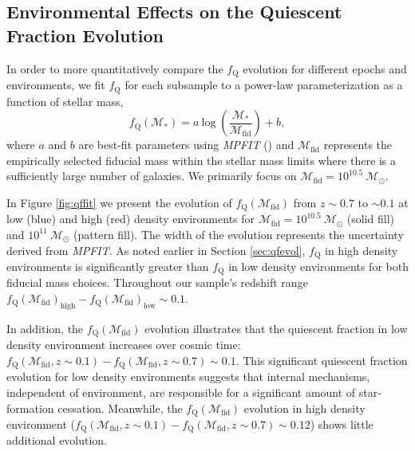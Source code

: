 \documentclass{emulateapj}
\begin{document}
\subsection{Environmental Effects on the Quiescent Fraction Evolution} \label{sec:env_qf_evol}
In order to more quantitatively compare the $f_{\mathrm{Q}}$ evolution for different epochs and environments, we fit $f_{\mathrm{Q}}$ for each subsample to a power-law parameterization as a function of stellar mass, 
\begin{equation} \label{eq:qffit}
f_{\mathrm{Q}}(\mathcal{M}_{*}) = a \: \mathrm{log} \; \left(\frac{ \mathcal{M}_{*}}{\mathcal{M}_{\mathrm{fid}}} \right)+b,
\end{equation}
where $a$ and $b$ are best-fit parameters using {\em MPFIT} (\citealt{Markwardt:2009aa}) and $\mathcal{M}_{\mathrm{fid}}$ represents the empirically selected fiducial mass within the stellar mass limits where there is a sufficiently large number of galaxies. We primarily focus on $\mathcal{M}_{\mathrm{fid}} = 10^{10.5} \: \mathcal{M}_{\odot}$. 

In Figure \ref{fig:qffit} we present the evolution of
$f_{\mathrm{Q}}(\mathcal{M}_{\mathrm{fid}})$ from $z \sim 0.7$ to $\sim 0.1$
at low (blue) and high (red) density environments for
$\mathcal{M}_{\mathrm{fid}} = 10^{10.5} \: \mathcal{M}_{\odot}$ (solid
fill) and $10^{11} \: \mathcal{M}_{\odot}$ (pattern fill). The width
of the evolution represents the uncertainty derived from {\em
  MPFIT}. As noted earlier in Section \ref{sec:qfevol}, $f_{\mathrm{Q}}$
in high density environments is significantly greater than
$f_{\mathrm{Q}}$ in low density environments for both fiducial mass
choices. Throughout our sample's redshift range
$f_{\mathrm{Q}}(\mathcal{M}_{\mathrm{fid}})_{\mathrm{high}} -
f_{\mathrm{Q}}(\mathcal{M}_{\mathrm{fid}})_{\mathrm{low}} \sim 0.1$.

In addition, the $f_{\mathrm{Q}}(\mathcal{M}_{\mathrm{fid}})$
evolution illustrates that the quiescent fraction in low density
environment increases over cosmic time:
$f_{\mathrm{Q}}(\mathcal{M}_{\mathrm{fid}}, z \sim 0.1) -
f_{\mathrm{Q}}(\mathcal{M}_{\mathrm{fid}}, z \sim 0.7) \sim 0.1$. This
significant quiescent fraction evolution for low density environments
suggests that internal mechanisms, independent of environment, are
responsible for a significant amount of star-formation cessation. Meanwhile, the $f_{\mathrm{Q}}(\mathcal{M}_{\mathrm{fid}})$ evolution in high density environment ($f_{\mathrm{Q}}(\mathcal{M}_{\mathrm{fid}}, z \sim 0.1) - f_{\mathrm{Q}}(\mathcal{M}_{\mathrm{fid}}, z \sim 0.7) \sim 0.12$) shows little additional evolution.
\end{document}

